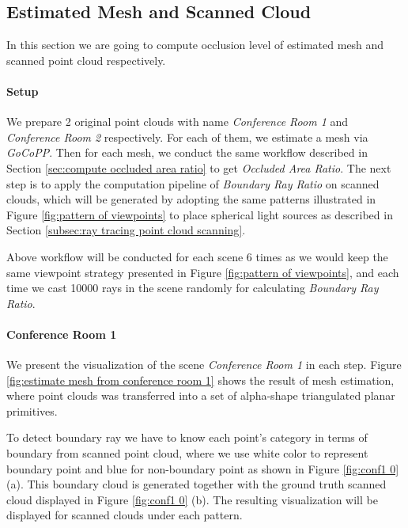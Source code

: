 \documentclass[11pt, a4paper,oneside,chapterprefix=false]{scrbook}
\begin{document}
\subsection{Estimated Mesh and Scanned Cloud} \label{subsec:estimate mesh and scanned cloud}

In this section we are going to compute occlusion level of estimated mesh and scanned point cloud respectively. 

\paragraph{Setup}

We prepare 2 original point clouds with name \emph{Conference Room 1} and \emph{Conference Room 2} respectively. For each of them, we estimate a mesh via \emph{GoCoPP}. Then for each mesh, we conduct the same workflow described in Section \ref{sec:compute occluded area ratio} to get \emph{Occluded Area Ratio}. The next step is to apply the computation pipeline of \emph{Boundary Ray Ratio} on scanned clouds, which will be generated by adopting the same patterns illustrated in Figure \ref{fig:pattern of viewpoints} to place spherical light sources as described in Section \ref{subsec:ray tracing point cloud scanning}.

\vspace{10pt}

Above workflow will be conducted for each scene 6 times as we would keep the same viewpoint strategy presented in Figure \ref{fig:pattern of viewpoints}, and each time we cast 10000 rays in the scene randomly for calculating \emph{Boundary Ray Ratio}.    

\paragraph{Conference Room 1} \label{par:conf1 result}

We present the visualization of the scene \emph{Conference Room 1} in each step. Figure \ref{fig:estimate mesh from conference room 1} shows the result of mesh estimation, where point clouds was transferred into a set of alpha-shape triangulated planar primitives.

\vspace{10pt}

To detect boundary ray we have to know each point's category in terms of boundary from scanned point cloud, where we use white color to represent boundary point and blue for non-boundary point as shown in Figure \ref{fig:conf1 0} (a). This boundary cloud is generated together with the ground truth scanned cloud displayed in Figure \ref{fig:conf1 0} (b). The resulting visualization will be displayed for scanned clouds under each pattern.
\end{document}

